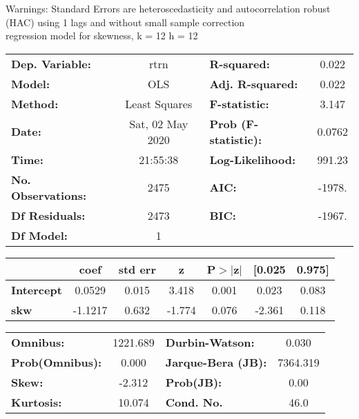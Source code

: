 Warnings: \newline
 [1] Standard Errors are heteroscedasticity and autocorrelation robust (HAC) using 1 lags and without small sample correction\\ 

regression model for skewness, k = 12 h = 12\begin{center}
\begin{tabular}{lclc}
\toprule
\textbf{Dep. Variable:}    &       rtrn       & \textbf{  R-squared:         } &     0.022   \\
\textbf{Model:}            &       OLS        & \textbf{  Adj. R-squared:    } &     0.022   \\
\textbf{Method:}           &  Least Squares   & \textbf{  F-statistic:       } &     3.147   \\
\textbf{Date:}             & Sat, 02 May 2020 & \textbf{  Prob (F-statistic):} &   0.0762    \\
\textbf{Time:}             &     21:55:38     & \textbf{  Log-Likelihood:    } &    991.23   \\
\textbf{No. Observations:} &        2475      & \textbf{  AIC:               } &    -1978.   \\
\textbf{Df Residuals:}     &        2473      & \textbf{  BIC:               } &    -1967.   \\
\textbf{Df Model:}         &           1      & \textbf{                     } &             \\
\bottomrule
\end{tabular}
\begin{tabular}{lcccccc}
                   & \textbf{coef} & \textbf{std err} & \textbf{z} & \textbf{P$> |$z$|$} & \textbf{[0.025} & \textbf{0.975]}  \\
\midrule
\textbf{Intercept} &       0.0529  &        0.015     &     3.418  &         0.001        &        0.023    &        0.083     \\
\textbf{skw}       &      -1.1217  &        0.632     &    -1.774  &         0.076        &       -2.361    &        0.118     \\
\bottomrule
\end{tabular}
\begin{tabular}{lclc}
\textbf{Omnibus:}       & 1221.689 & \textbf{  Durbin-Watson:     } &    0.030  \\
\textbf{Prob(Omnibus):} &   0.000  & \textbf{  Jarque-Bera (JB):  } & 7364.319  \\
\textbf{Skew:}          &  -2.312  & \textbf{  Prob(JB):          } &     0.00  \\
\textbf{Kurtosis:}      &  10.074  & \textbf{  Cond. No.          } &     46.0  \\
\bottomrule
\end{tabular}
\end{center}

